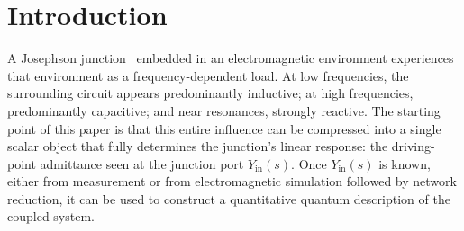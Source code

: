 \documentclass[reprint, floatfix, superscriptaddress, amsmath, amssymb, longbibliography]{revtex4-2}
\newcommand{\Yin}{Y_{\mathrm{in}}}
\begin{document}
\maketitle




\section{Introduction}
\label{sec:introduction}

A Josephson junction~\cite{Josephson1962} embedded in an electromagnetic environment experiences that environment as a frequency-dependent load. At low frequencies, the surrounding circuit appears predominantly inductive; at high frequencies, predominantly capacitive; and near resonances, strongly reactive. The starting point of this paper is that this entire influence can be compressed into a single scalar object that fully determines the junction's linear response: the driving-point admittance seen at the junction port $\Yin(s)$. Once $\Yin(s)$ is known, either from measurement or from electromagnetic simulation followed by network reduction, it can be used to construct a quantitative quantum description of the coupled system.
\end{document}
